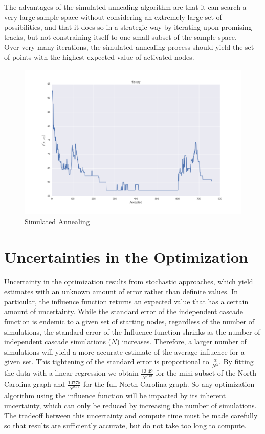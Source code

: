 \documentclass[11pt]{scrartcl} %
\begin{document}
The advantages of the simulated annealing algorithm are that it can search a very large sample space without considering an extremely large set of possibilities, and that it does so in a strategic way by iterating upon promising tracks, but not constraining itself to one small subset of the sample space.  \\

Over very many iterations, the simulated annealing process should yield the set of points with the highest expected value of activated nodes. \\

\begin{figure}[h!]
\centering
\includegraphics[width=10 cm]{SimAn}
\caption{Simulated Annealing}
\label{fig:SA}
\end{figure}

\section{Uncertainties in the Optimization}

Uncertainty in the optimization results from stochastic approaches, which yield estimates with an unknown amount of error rather than definite values.  In particular, the influence function returns an expected value that has a certain amount of uncertainty.  While the standard error of the independent cascade function is endemic to a given set of starting nodes, regardless of the number of simulations, the standard error of the Influence function shrinks as the number of independent cascade simulations ($N$) increases.  Therefore, a larger number of simulations will yield a more accurate estimate of the average influence for a given set.  This tightening of the standard error is proportional to $\frac{\alpha}{N^{\lambda}}$. By fitting the data with a linear regression we obtain  $\frac{13.49}{N^{0.49}}$ for the mini-subset of the North Carolina graph and $\frac{10775}{N^{0.55}}$ for the full North Carolina graph.  So any optimization algorithm using the influence function will be impacted by its inherent uncertainty, which can only be reduced by increasing the number of simulations.  The tradeoff between this uncertainty and compute time must be made carefully so that results are sufficiently accurate, but do not take too long to compute.  \\
	
\end{document}

